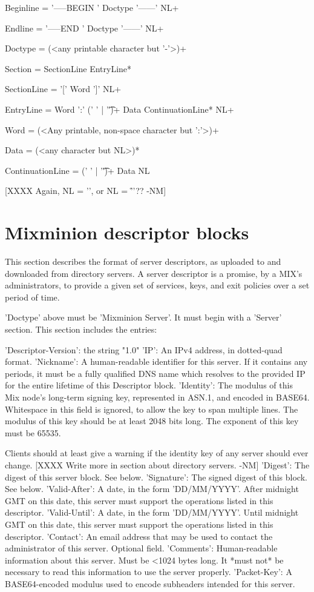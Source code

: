 Beginline = '-----BEGIN ' Doctype '------' NL+

Endline = '-----END ' Doctype '------' NL+

Doctype = (<any printable character but '-'>)+

Section = SectionLine EntryLine*

SectionLine = '[' Word ']' NL+

EntryLine = Word ':' (' ' | '\t')+ Data ContinuationLine* NL+

Word = (<Any printable, non-space character but ':'>)+

Data = (<any character but NL>)*

ContinuationLine = (' ' | '\t')+ Data NL

[XXXX Again, NL = '\n', or NL = '\r\n'?? -NM]

\section{Mixminion descriptor blocks}

This section describes the format of server descriptors, as uploaded
to and downloaded from directory servers.  A server descriptor is a
promise, by a MIX's administrators, to provide a given set of
services, keys, and exit policies over a set period of time.


'Doctype' above must be 'Mixminion Server'.  It must begin with a
'Server' section.  This section includes the entries:

     'Descriptor-Version':  the string "1.0"
     'IP': An IPv4 address, in dotted-quad format.
     'Nickname': A human-readable identifier for this server.  If it
         contains any periods, it must be a fully qualified DNS name
         which resolves to the provided IP for the entire lifetime of
         this Descriptor block.
     'Identity': The modulus of this Mix node's long-term signing key,
         represented in ASN.1, and encoded in BASE64.  Whitespace in
         this field is ignored, to allow the key to span multiple
         lines.  The modulus of this key should be at least 2048 bits
         long.  The exponent of this key must be 65535.

	 Clients should at least give a warning if the identity key of
         any server should ever change. [XXXX Write more in section
         about directory servers. -NM]
     'Digest': The digest of this server block.  See below.
     'Signature': The signed digest of this block.  See below.
     'Valid-After': A date, in the form 'DD/MM/YYYY'.  After midnight GMT
         on this date, this server must support the operations listed
         in this descriptor.
     'Valid-Until': A date, in the form 'DD/MM/YYYY'.  Until midnight
         GMT on this date, this server must support the operations listed
         in this descriptor.
     'Contact': An email address that may be used to contact the
         administrator of this server. Optional field.
     'Comments': Human-readable information about this server.  Must
         be <1024 bytes long.  It *must not* be necessary to read this
         information to use the server properly.
     'Packet-Key': A BASE64-encoded modulus used to encode subheaders
         intended for this server.

